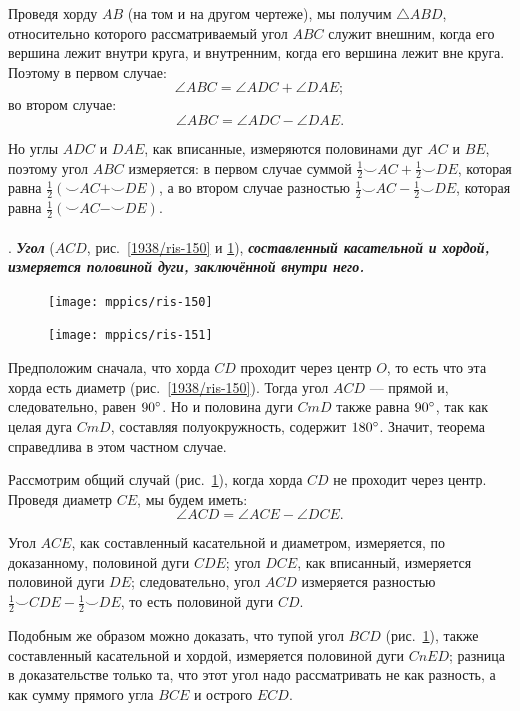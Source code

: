 \documentclass[twoside]{book}
\begin{document}
Проведя хорду $AB$ (на том и на другом чертеже), мы получим $\triangle ABD$, относительно которого рассматриваемый угол $ABC$ служит внешним, когда его вершина лежит внутри круга, и внутренним, когда его вершина лежит вне круга.
Поэтому в первом случае:
\[\angle ABC = \angle ADC+\angle DAE;\]
во втором случае:
\[\angle ABC = \angle ADC-\angle DAE.\]

Но углы $ADC$ и $DAE$, как вписанные, измеряются половинами дуг $AC$ и $BE$, поэтому угол $ABC$ измеряется:
в первом случае суммой
$\tfrac12{\smallsmile}AC+\tfrac12{\smallsmile}DE$, которая равна $\tfrac12({\smallsmile}AC+{\smallsmile}DE)$, а во втором случае разностью $\tfrac12{\smallsmile}AC-\tfrac12{\smallsmile}DE$, которая равна $\tfrac12({\smallsmile}AC-{\smallsmile}DE)$.

\paragraph{}\label{1938/131}
.
\textbf{\emph{Угол}} ($ACD$, рис.~\ref{1938/ris-150} и \ref{1938/ris-151}), \textbf{\emph{составленный касательной и хордой, измеряется половиной дуги, заключённой внутри него.}}

\begin{figure}
\centering
\texttt{[image: mppics/ris-150]}
\caption{}\label{1938/ris-150}
\bigskip
\texttt{[image: mppics/ris-151]}
\caption{}\label{1938/ris-151}
\end{figure}

Предположим сначала, что хорда $CD$ проходит через центр $O$, то есть что эта хорда есть диаметр (рис.~\ref{1938/ris-150}).
Тогда угол $ACD$ — прямой и,
следовательно, равен $90\degree$.
Но и половина дуги $CmD$ также равна $90\degree$, так как целая дуга $CmD$, составляя полуокружность, содержит $180\degree$.
Значит, теорема справедлива в этом частном случае.

Рассмотрим общий случай (рис.~\ref{1938/ris-151}), когда хорда $CD$ не проходит через центр.
Проведя диаметр $CE$, мы будем иметь:
\[\angle ACD = \angle ACE - \angle DCE.\]

Угол $ACE$, как составленный касательной и диаметром, измеряется, по доказанному, половиной дуги $CDE$;
угол $DCE$, как вписанный, измеряется половиной дуги $DE$;
следовательно, угол $ACD$ измеряется разностью $\tfrac12{\smallsmile}CDE-\tfrac12{\smallsmile}DE$, то есть половиной дуги $CD$.

Подобным же образом можно доказать, что тупой угол $BCD$ (рис.~\ref{1938/ris-151}), также составленный касательной и хордой, измеряется половиной дуги $CnED$;
разница в доказательстве только та, что этот угол надо рассматривать не как разность, а как сумму прямого угла $BCE$ и острого $ECD$.
\end{document}
